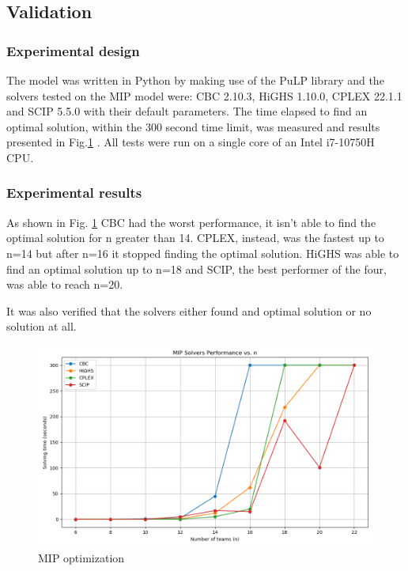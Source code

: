 \subsection{Validation}
\subsubsection*{Experimental design}
The model was written in Python by making use of the PuLP library and the solvers tested on the MIP model were: CBC 2.10.3, HiGHS 1.10.0, CPLEX 22.1.1 and SCIP 5.5.0 with their default parameters. The time elapsed to find an optimal solution, within the 300 second time limit, was measured and results presented in Fig.\ref{fig:MIP-solution} . All tests were run on a single core of an Intel i7-10750H CPU.

\subsubsection*{Experimental results}
As shown in Fig. \ref{fig:MIP-solution} CBC had the worst performance, it isn't able to find the optimal solution for n greater than 14. CPLEX, instead, was the fastest up to n=14 but after n=16 it stopped finding the optimal solution. HiGHS was able to find an optimal solution up to n=18 and SCIP, the best performer of the four, was able to reach n=20.

It was also verified that the solvers either found and optimal solution or no solution at all.

\begin{figure}
    \centering
    \includegraphics[width=0.8\linewidth]{img/MIP-result.png}
    \caption{MIP optimization}
    \label{fig:MIP-solution}
\end{figure}